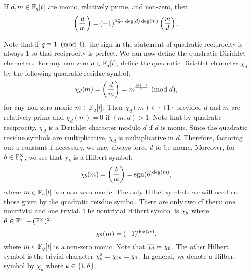 \documentclass[12pt,reqno,oneside]{amsart}
\begin{document}
    \begin{theorem}
        If $d,m \in \mathbb{F}_{q}[t]$ are monic, relatively prime, and non-zero, then
        \[
            \left(\frac{d}{m}\right) = (-1)^{\frac{q-1}{2}\deg(d)\deg(m)}\left(\frac{m}{d}\right).
        \]
    \end{theorem}

    Note that if $q \equiv 1 \ \left(\text{mod }4\right)$, the sign in the statement of quadratic reciprocity is always $1$ so that reciprocity is perfect. We can now define the quadratic Dirichlet characters. For any non-zero $d \in \mathbb{F}_{q}[t]$, define the quadratic Dirichlet character $\chi_{d}$ by the following quadratic residue symbol:
    \[
        \chi_{d}(m) = \left(\frac{d}{m}\right) = m^{\frac{|d|-1}{2}} \pmod{d},
    \]
    for any non-zero monic $m \in \mathbb{F}_{q}[t]$. Then $\chi_{d}(m) \in \{\pm 1\}$ provided $d$ and $m$ are relatively prime and $\chi_{d}(m) = 0$ if $(m,d) > 1$. Note that by quadratic reciprocity, $\chi_{d}$ is a Dirichlet character modulo $d$ if $d$ is monic. Since the quadratic residue symbols are multiplicative, $\chi_{d}$ is multiplicative in $d$. Therefore, factoring out a constant if necessary, we may always force $d$ to be monic. Moreover, for $b \in \mathbb{F}_{q}^{\times}$, we see that $\chi_{b}$ is a Hilbert symbol:
    \[
        \chi_{b}(m) = \left(\frac{b}{m}\right) = \operatorname{\mathrm{sgn}}(b)^{\deg(m)},
    \]
    where $m \in \mathbb{F}_{q}[t]$ is a non-zero monic. The only Hilbet symbols we will need are those given by the quadratic reisdue symbol. There are only two of them: one nontrivial and one trivial. The nontrivial Hilbert symbol is $\chi_{\theta}$ where $\theta \in \mathbb{F}^{\times}-(\mathbb{F}^{\times})^{2}$:
    \[
        \chi_{\theta}(m) = (-1)^{\deg(m)},
    \]
    where $m \in \mathbb{F}_{q}[t]$ is a non-zero monic. Note that $\overline{\chi_{\theta}} = \chi_{\theta}$. The other Hilbert symbol is the trivial character $\chi_{\theta}^{2} = \chi_{\theta\theta} = \chi_{1}$. In general, we denote a Hilbert symbol by $\chi_{a}$ where $a \in \{1,\theta\}$.
    
\end{document}
